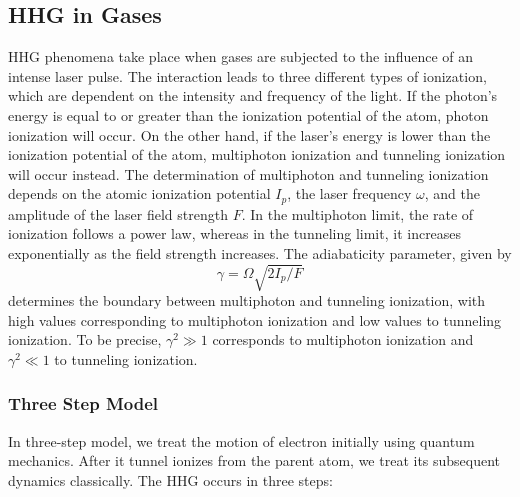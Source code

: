 \subsection{HHG in Gases}

HHG phenomena take place when gases are subjected to the influence of an intense laser pulse. The interaction leads to three different types of ionization, which are dependent on the intensity and frequency of the light. If the photon's energy is equal to or greater than the ionization potential of the atom, photon ionization will occur. On the other hand, if the laser's energy is lower than the ionization potential of the atom, multiphoton ionization and tunneling ionization will occur instead. The determination of multiphoton and tunneling ionization depends on the atomic ionization potential $I_p$, the laser frequency $\omega$, and the amplitude of the laser field strength $F$. In the multiphoton limit, the rate of ionization follows a power law, whereas in the tunneling limit, it increases exponentially as the field strength increases. The adiabaticity parameter, given by
\begin{equation}
    \label{eq:adiabatic}
    \gamma =\Omega \sqrt{2I_p/F}
\end{equation}
determines the boundary between multiphoton and tunneling ionization, with high values corresponding to multiphoton ionization and low values to tunneling ionization. To be precise, $\gamma^2 \gg 1$ corresponds to multiphoton ionization and $\gamma^2 \ll 1$ to tunneling ionization.\cite{gas-second}

\subsubsection{Three Step Model}

In three-step model, we treat the motion of electron initially using quantum mechanics. After it tunnel ionizes from the parent atom, we treat its subsequent dynamics classically. The HHG occurs in three steps:

